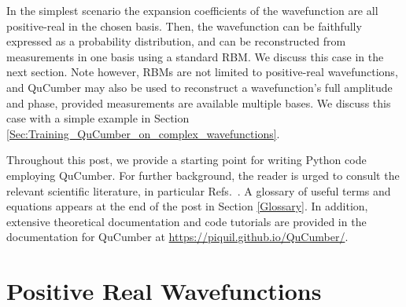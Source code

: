 \documentclass[submission, Phys]{SciPost}
\begin{document}

In the simplest scenario the expansion coefficients of the wavefunction are all positive-real in the chosen basis.
Then, the wavefunction can be faithfully expressed as a probability distribution, and can be reconstructed 
from measurements in one basis using a standard RBM.  We discuss this case in the next section.
Note however, RBMs are not limited to positive-real wavefunctions, and QuCumber may also be used to reconstruct a 
wavefunction's full amplitude and phase, provided measurements are available multiple bases.
We discuss this case with a simple example in Section \ref{Sec:Training_QuCumber_on_complex_wavefunctions}.

Throughout this post, we provide a starting point for writing Python code employing QuCumber.
For further background, the reader is urged to consult the relevant scientific literature, in particular Refs.~\cite{Torlai2016thermo, torlai2018tomography}.
A glossary of useful terms and equations appears at the end of the post in Section \ref{Glossary}.
In addition, extensive theoretical documentation and code tutorials are provided in the documentation for QuCumber at \url{https://piquil.github.io/QuCumber/}.


\section{Positive Real Wavefunctions}
\end{document}
